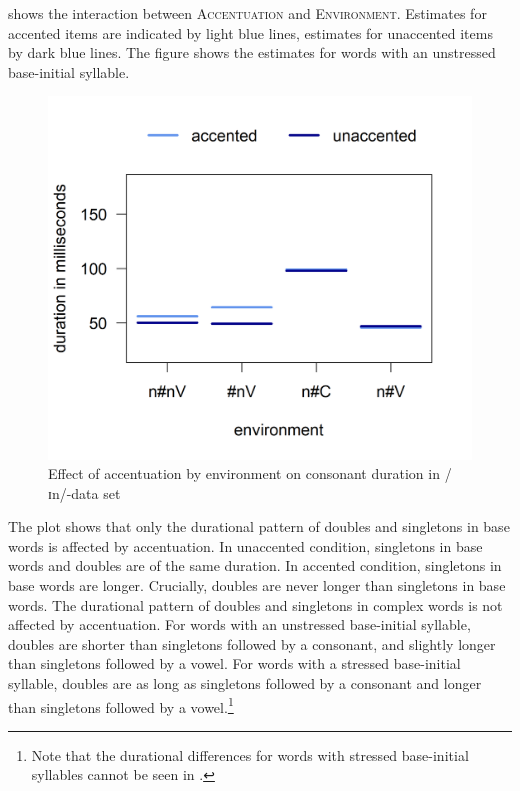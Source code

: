  shows the interaction between \textsc{Accentuation} and \textsc{Environment}. Estimates for accented items are indicated by light blue lines, estimates for unaccented items by dark blue lines. The figure shows the estimates for words with an unstressed base-initial syllable. 


	\begin{figure}[h!]
		\centering
		\vspace*{-0.3cm}
		\includegraphics [scale=0.5] {images/Experiment/InModelCompleteInterEnvAcc}
		\caption{Effect of accentuation by environment on consonant duration in /ɪn/-data set}
		\label{fig:Env Acc In complete experiment}
	\end{figure}


The plot shows that only the durational pattern of doubles and singletons in base words is affected by accentuation. 
In unaccented condition, singletons in base words and doubles are of the same duration. In accented condition, singletons in base words are longer. Crucially, doubles are never longer than singletons in base words.
The durational pattern of doubles and singletons in complex words is not affected by accentuation. For words with an unstressed base-initial syllable, doubles are shorter than singletons followed by a consonant, and slightly longer than singletons followed by a vowel. For words with a stressed base-initial syllable, doubles are as long as singletons followed by a consonant and longer than singletons followed by a vowel.\footnote{Note that the durational differences for words with stressed base-initial syllables cannot be seen in .} 


